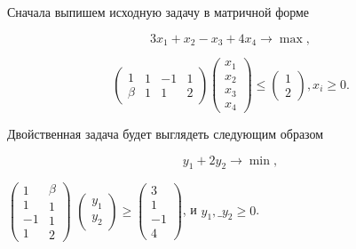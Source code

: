\begin{solution}
Сначала выпишем исходную задачу в матричной форме


\[3x_{1} +x_{2} -x_{3} +4x_{4} \to \max ,\] 

\[\left(\begin{array}{c} {1} \\ {\beta } \end{array}\begin{array}{c} {1} \\ {1} \end{array}\begin{array}{c} {-1} \\ {1} \end{array}\begin{array}{c} {1} \\ {2} \end{array}\right)\left(\begin{array}{c} {x_{1} } \\ {x_{2} } \\ {x_{3} } \\ {x_{4} } \end{array}\right)\le \left(\begin{array}{c} {1} \\ {2} \end{array}\right), x_{i} \ge 0.\] 

Двойственная задача будет выглядеть следующим образом

\[y_{1} +2y_{2} \to \min ,\] 

$\left(\begin{array}{c} {1} \\ {1} \\ {-1} \\ {1} \end{array}\begin{array}{c} {\beta } \\ {1} \\ {1} \\ {2} \end{array}\right)$
$\left(\begin{array}{c} {y_{1} } \\ {y_{2} } \end{array}\right)\ge \left(\begin{array}{c} {3} \\ {1} \\ {-1} \\ {4} \end{array}\right)$, и $y_{1} ,\_ y_{2} \ge 0$.


\end{solution}
